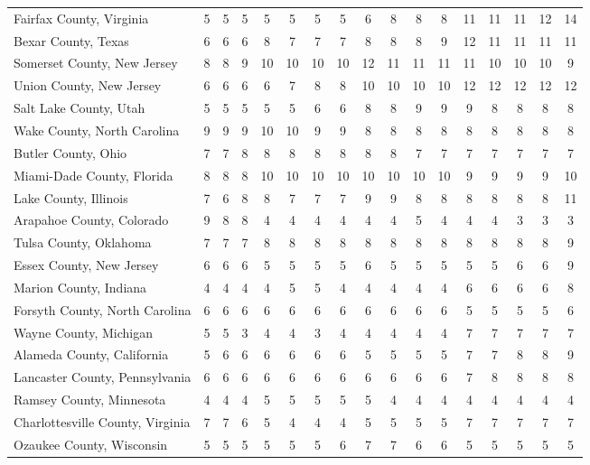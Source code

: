 \begin{landscape}
\begin{longtable}{lcccccccccccccccc}
	Fairfax County, Virginia & 5 & 5 & 5 & 5 & 5 & 5 & 5 & 6 & 8 & 8 & 8 & 11 & 11 & 11 & 12 & 14 \\
	Bexar County, Texas & 6 & 6 & 6 & 8 & 7 & 7 & 7 & 8 & 8 & 8 & 9 & 12 & 11 & 11 & 11 & 11 \\
	Somerset County, New Jersey & 8 & 8 & 9 & 10 & 10 & 10 & 10 & 12 & 11 & 11 & 11 & 11 & 10 & 10 & 10 & 9 \\
	Union County, New Jersey & 6 & 6 & 6 & 6 & 7 & 8 & 8 & 10 & 10 & 10 & 10 & 12 & 12 & 12 & 12 & 12 \\
	Salt Lake County, Utah & 5 & 5 & 5 & 5 & 5 & 6 & 6 & 8 & 8 & 9 & 9 & 9 & 8 & 8 & 8 & 8 \\
	Wake County, North Carolina & 9 & 9 & 9 & 10 & 10 & 9 & 9 & 8 & 8 & 8 & 8 & 8 & 8 & 8 & 8 & 8 \\
	Butler County, Ohio & 7 & 7 & 8 & 8 & 8 & 8 & 8 & 8 & 8 & 7 & 7 & 7 & 7 & 7 & 7 & 7 \\
	Miami-Dade County, Florida & 8 & 8 & 8 & 10 & 10 & 10 & 10 & 10 & 10 & 10 & 10 & 9 & 9 & 9 & 9 & 10 \\
	Lake County, Illinois & 7 & 6 & 8 & 8 & 7 & 7 & 7 & 9 & 9 & 8 & 8 & 8 & 8 & 8 & 8 & 11 \\
	Arapahoe County, Colorado & 9 & 8 & 8 & 4 & 4 & 4 & 4 & 4 & 4 & 5 & 4 & 4 & 4 & 3 & 3 & 3 \\
	Tulsa County, Oklahoma & 7 & 7 & 7 & 8 & 8 & 8 & 8 & 8 & 8 & 8 & 8 & 8 & 8 & 8 & 8 & 9 \\
	Essex County, New Jersey & 6 & 6 & 6 & 5 & 5 & 5 & 5 & 6 & 5 & 5 & 5 & 5 & 5 & 6 & 6 & 9 \\
	Marion County, Indiana & 4 & 4 & 4 & 4 & 5 & 5 & 4 & 4 & 4 & 4 & 4 & 6 & 6 & 6 & 6 & 8 \\
	Forsyth County, North Carolina & 6 & 6 & 6 & 6 & 6 & 6 & 6 & 6 & 6 & 6 & 6 & 5 & 5 & 5 & 5 & 6 \\
	Wayne County, Michigan & 5 & 5 & 3 & 4 & 4 & 3 & 4 & 4 & 4 & 4 & 4 & 7 & 7 & 7 & 7 & 7 \\
	Alameda County, California & 5 & 6 & 6 & 6 & 6 & 6 & 6 & 5 & 5 & 5 & 5 & 7 & 7 & 8 & 8 & 9 \\
	Lancaster County, Pennsylvania & 6 & 6 & 6 & 6 & 6 & 6 & 6 & 6 & 6 & 6 & 6 & 7 & 8 & 8 & 8 & 8 \\
	Ramsey County, Minnesota & 4 & 4 & 4 & 5 & 5 & 5 & 5 & 5 & 4 & 4 & 4 & 4 & 4 & 4 & 4 & 4 \\
	Charlottesville County, Virginia & 7 & 7 & 6 & 5 & 4 & 4 & 4 & 5 & 5 & 5 & 5 & 7 & 7 & 7 & 7 & 7 \\
	Ozaukee County, Wisconsin & 5 & 5 & 5 & 5 & 5 & 5 & 6 & 7 & 7 & 6 & 6 & 5 & 5 & 5 & 5 & 5 \\

\end{longtable}
\end{landscape}
